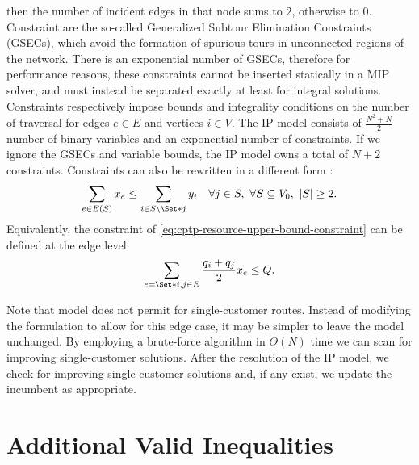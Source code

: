 then the number of incident edges in that node sums to $2$, otherwise to $0$.
Constraint 
are the so-called Generalized Subtour Elimination Constraints (GSECs),
which avoid the formation of spurious tours in unconnected regions of the network.
There is an exponential number of GSECs,
therefore for performance reasons,
these constraints cannot be inserted statically in a MIP solver,
and must instead be separated exactly at least for integral solutions.
Constraints  respectively
impose bounds and integrality conditions
on the number of traversal for edges $e \in E$ and vertices $i \in V$.
The IP model consists of $\frac{N^2 + N}{2}$ number of binary variables and an exponential number of constraints.
If we ignore the GSECs and variable bounds, the IP model owns a total of $N + 2$ constraints.
Constraints 
can also be rewritten in a different form \parencite{wolsey2020integer}:
\begin{equation}
	\label{eq:cptp-gsec-constraints-v2}
	\sum\limits_{e \in E(S)} x_e \le \sum\limits_{i \in S \setminus \Set*{j}} y_i \quad \forall j \in S,\ \forall S \subseteq V_0,\ |S| \ge 2.
\end{equation}
Equivalently, the constraint of \cref{eq:cptp-resource-upper-bound-constraint}
can be defined at the edge level:
\begin{equation}
	\label{eq:cptp-resource-upper-bound-constraint-edge-level}
	\sum_{e = \Set*{i, j} \in E} \frac{q_i + q_j}{2} x_e \le Q.
\end{equation}

Note that model
does not permit for single-customer routes.
Instead of modifying the formulation to allow for this edge case,
it may be simpler to leave the model unchanged.
By employing a brute-force algorithm in $\Theta(N)$ time we can scan for improving single-customer solutions.
After the resolution of the IP model,
we check for improving single-customer solutions and,
if any exist,
we update the incumbent as appropriate.

\section{Additional Valid Inequalities}
\label{sec:cptp-additional-valid-inequalities}

